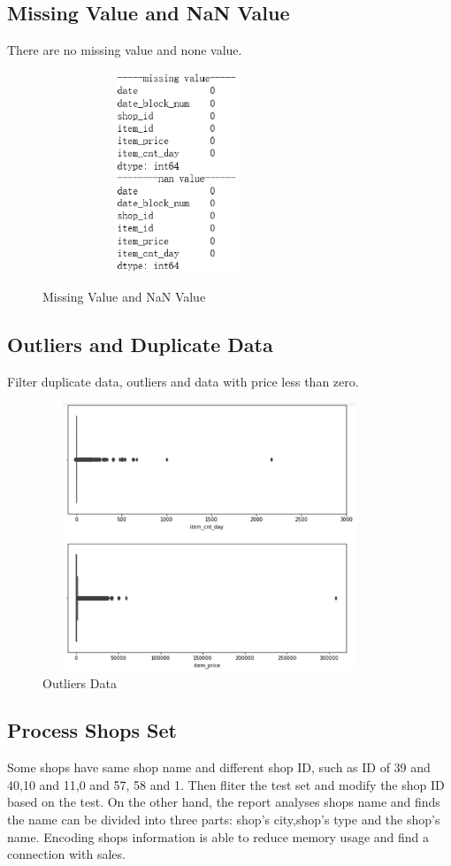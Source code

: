 \subsection{Missing Value and NaN Value} There are no missing value and none value.
	\begin{figure}[htb]
	\centering
	\includegraphics[width=8cm, height=6cm]{figures/miss.eps}\\
	\caption{Missing Value and NaN Value
	}\label{straddltimeScale}
\end{figure}
\subsection{Outliers and Duplicate Data} Filter duplicate data, outliers and data with price less than zero.
\begin{figure}[htb]
	\centering
	\includegraphics[width=10cm, height=8cm]{figures/outliers.eps}
	\caption{Outliers Data
	}\label{straddltimeScale}
\end{figure}

\subsection{Process Shops Set} Some shops have same shop name and different shop ID, such as ID of 39 and 40,10 and 11,0 and 57, 58 and 1. Then fliter the test set and modify the shop ID based on the test.
On the other hand, the report analyses shops name and finds the name can be divided into three parts: shop’s city,shop’s type and the shop’s name. Encoding shops information is able to reduce memory usage and find a connection with sales.

